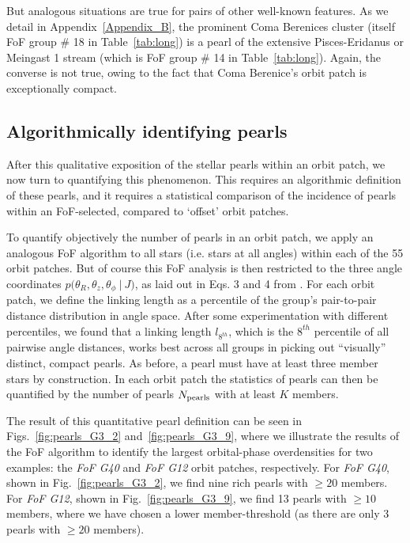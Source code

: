 \documentclass[twocolumn]{aastex631}
\begin{document}
But analogous situations are true for pairs of other well-known features. As we detail in 
Appendix~\ref{Appendix_B}, the prominent Coma Berenices cluster (itself FoF group \# 18 in Table~\ref{tab:long}) is a pearl of the extensive Pisces-Eridanus or Meingast 1 stream (which is FoF group \# 14 in Table~\ref{tab:long}). Again, the converse is not true, owing to the fact that Coma Berenice's orbit patch is exceptionally compact.

\subsection{Algorithmically identifying pearls}
\label{quant_pearls}

After this qualitative exposition of the stellar pearls within an orbit patch, we now turn to quantifying this phenomenon. This requires an algorithmic definition of these pearls, and it requires a statistical comparison of the incidence of pearls within an FoF-selected, compared to `offset' orbit patches.



To quantify objectively the number of pearls in an orbit patch, we apply an analogous FoF algorithm to all stars (i.e. stars at all angles) within each of the 55 orbit patches. But of course this FoF analysis is then restricted to the three angle coordinates $p\bigl (\theta_{R}, \theta_{z}, \theta_{\phi}~|~\mathbf{}{J}\bigr )$, as laid out in Eqs. 3 and 4 from \citet{2020MNRAS.495.4098C}. For each orbit patch, we define the linking length as a percentile of the group's pair-to-pair distance distribution in angle space. After some experimentation with different percentiles, we found that a linking length $l_{8^{th}}$, which is the $8^{th}$ percentile of all pairwise angle distances, works best across all groups in picking out ``visually'' distinct, compact pearls. As before, a pearl must have at least three member stars by construction. In each orbit patch the statistics of pearls can then be quantified by the number of pearls $N_{\rm pearls}$ with at least $K$ members. 

The result of this quantitative pearl definition can be seen in Figs.~\ref{fig:pearls_G3_2} and~\ref{fig:pearls_G3_9}, where we illustrate the results of the FoF algorithm to identify the largest orbital-phase overdensities for two examples: the \textit{FoF G40} and \textit{FoF G12} orbit patches, respectively. 
For \textit{FoF G40}, shown in Fig.~\ref{fig:pearls_G3_2}, we find nine rich pearls with $\ge 20$ members. 
For \textit{FoF G12}, shown in Fig.~\ref{fig:pearls_G3_9}, we find 13 pearls with $\ge 10$ members, where we have chosen a lower member-threshold (as there are only 3 pearls with $\ge 20$ members). 
\end{document}
